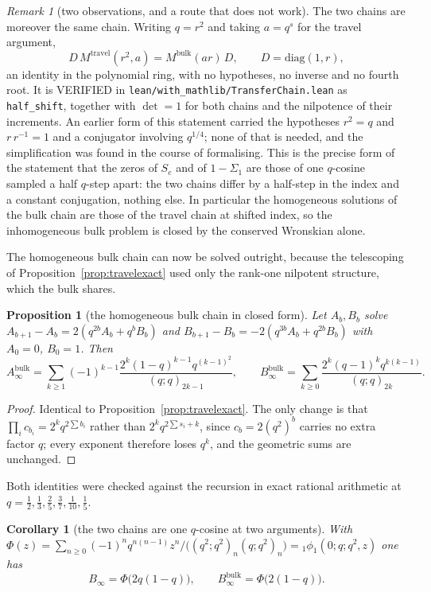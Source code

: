 \documentclass[11pt]{article}
\newtheorem{proposition}[theorem]{Proposition}
\newtheorem{corollary}[theorem]{Corollary}
\theoremstyle{definition}
\theoremstyle{remark}
\newtheorem{remark}[theorem]{Remark}
\theoremstyle{definition}
\begin{document}
\begin{remark}[two observations, and a route that does not work]
The two chains are moreover the same chain. Writing $q=r^2$ and taking $a=q^s$ for the travel
argument,
\[
   D\,M^{\mathrm{travel}}(r^2,a)=M^{\mathrm{bulk}}(ar)\,D,\qquad
   D=\mathrm{diag}(1,r) ,
\]
an identity in the polynomial ring, with no hypotheses, no inverse and no fourth root. It is
VERIFIED in \texttt{lean/with\_mathlib/TransferChain.lean} as \texttt{half\_shift}, together
with $\det=1$ for both chains and the nilpotence of their increments. An earlier form of this
statement carried the hypotheses $r^2=q$ and $r\,r^{-1}=1$ and a conjugator involving
$q^{1/4}$; none of that is needed, and the simplification was found in the course of
formalising. This is the precise form of the statement that the zeros of
$S_e$ and of $1-\Sigma_1$ are those of one $q$-cosine sampled a half $q$-step apart: the two
chains differ by a half-step in the index and a constant conjugation, nothing else. In particular
the homogeneous solutions of the bulk chain are those of the travel chain at shifted index, so the
inhomogeneous bulk problem is closed by the conserved Wronskian alone.

The homogeneous bulk chain can now be solved outright, because the telescoping of
Proposition~\ref{prop:travelexact} used only the rank-one nilpotent structure, which the bulk
shares.

\begin{proposition}[the homogeneous bulk chain in closed form]\label{prop:bulkexact}
Let $A_b,B_b$ solve $A_{b+1}-A_b=2(q^{2b}A_b+q^bB_b)$ and
$B_{b+1}-B_b=-2(q^{3b}A_b+q^{2b}B_b)$ with $A_0=0$, $B_0=1$. Then
\[
  A^{\mathrm{bulk}}_\infty=\sum_{k\ge1}(-1)^{k-1}\frac{2^k(1-q)^{k-1}q^{(k-1)^2}}{(q;q)_{2k-1}},
  \qquad
  B^{\mathrm{bulk}}_\infty=\sum_{k\ge0}\frac{2^k(q-1)^kq^{k(k-1)}}{(q;q)_{2k}} .
\]
\end{proposition}

\begin{proof}
Identical to Proposition~\ref{prop:travelexact}. The only change is that
$\prod_ic_{b_i}=2^kq^{2\sum b_i}$ rather than $2^kq^{2\sum s_i+k}$, since $c_b=2(q^2)^b$ carries no
extra factor $q$; every exponent therefore loses $q^k$, and the geometric sums are unchanged.
\end{proof}

Both identities were checked against the recursion in exact rational arithmetic at
$q=\tfrac12,\tfrac13,\tfrac25,\tfrac37,\tfrac1{10},\tfrac15$.

\begin{corollary}[the two chains are one $q$-cosine at two arguments]\label{cor:halfstep}
With $\Phi(z)=\sum_{n\ge0}(-1)^nq^{n(n-1)}z^n/\bigl((q^2;q^2)_n(q;q^2)_n\bigr)
={}_1\phi_1(0;q;q^2,z)$ one has
\[
  B_\infty=\Phi\bigl(2q(1-q)\bigr),\qquad B^{\mathrm{bulk}}_\infty=\Phi\bigl(2(1-q)\bigr).
\]
\end{corollary}


\end{remark}
\end{document}
